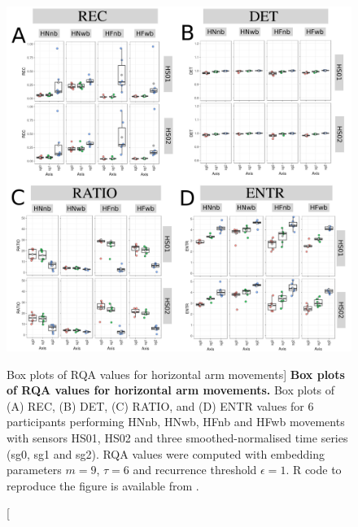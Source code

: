 %
%




\begin{figure}
\centering
\includegraphics[width=1.0\textwidth]{BP-rqa-h}
	\caption
	[Box plots of RQA values for horizontal arm movements]{
	{\bf Box plots of RQA values for horizontal arm movements.}
	Box plots of (A) REC, (B) DET, (C) RATIO, and (D) ENTR values 
	for 6 participants performing HNnb, HNwb, HFnb and HFwb movements
	with sensors HS01, HS02 and three smoothed-normalised  
	time series (sg0, sg1 and sg2).
	RQA values were computed with 
	embedding parameters $m=9$, $\tau=6$ and recurrence threshold
	$\epsilon=1$.
	R code to reproduce the figure is available from \cite{hwum2018}.
        }
    \label{fig:BPRQAH}
\end{figure}
%


